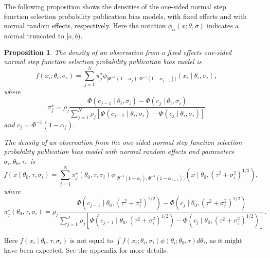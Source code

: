 \documentclass[useAMS,usenatbib,referee]{biom}
\newtheorem{prop}[theorem]{Proposition}
\renewcommand{\sqrt}[1]{(#1)^{1/2}}
\begin{document}
The following proposition shows the densities of the one-sided normal step function selection probability publication bias models, with fixed effects and with normal random effects, respectively. Here the notation $\phi_{\alpha}(x;\theta,\sigma)$ indicates a normal truncated to $[a,b)$.
\begin{prop}
\label{prop:One-sided normal discrete probability vector publication bias model-1}
The density of an observation from a fixed effects one-sided normal step function selection probability publication bias model is
\begin{equation}\label{eq:Fixed effects, publication bias}
f(x_{i};\theta_{i},\sigma_{i}) = \sum_{j=1}^{N}\pi_{j}^\star\phi_{[\Phi^{-1}(1-\alpha_{j}),\Phi^{-1}(1-\alpha_{j-1}))}(x_{i}\mid\theta_{i},\sigma_{i}),
\end{equation}
where
$$
\pi_{j}^{\star}=\rho_{j}\frac{\Phi(c_{j-1}\mid\theta_{i},\sigma_{i})-\Phi(c_{j}\mid\theta_{i},\sigma_{i})}{\sum_{j=1}^{N}\rho_{j}\left[\Phi(c_{j-1}\mid\theta_{i},\sigma_{i})-\Phi(c_{j}\mid\theta_{i},\sigma_{i})\right]}
$$
and $c_{j}=\Phi^{-1}(1-\alpha_{j})$.

The density of an observation from the one-sided normal step function selection probability publication bias model with normal random effects and parameters $\sigma_{i},\theta_{0},\tau,$ is
\begin{equation}\label{eq:Random effects, publication bias}
f(x\mid\theta_{0},\tau,\sigma_{i})=\sum_{j=1}^{N}\pi_{j}^{\star}(\theta_0,\tau,\sigma_{i})\phi_{[\Phi^{-1}(1-\alpha_{j}),\Phi^{-1}(1-\alpha_{j-1}))}(x\mid\theta_{0},\sqrt{\tau^{2}+\sigma_{i}^{2}}),
\end{equation}
where 
\[
\pi_{j}^{\star}(\theta_0,\tau,\sigma_{i})=\rho_{j}\frac{\Phi(c_{j-1}\mid\theta_{0},\sqrt{\tau^{2}+\sigma_{i}^{2}})-\Phi(c_{j}\mid\theta_{0},\sqrt{\tau^{2}+\sigma_{i}^{2}})}{\sum_{j=1}^{J}\rho_{j}\left[\Phi(c_{j-1}\mid\theta_{0},\sqrt{\tau^{2}+\sigma_{i}^{2}})-\Phi(c_{j}\mid\theta_{0},\sqrt{\tau^{2}+\sigma_{i}^{2}})\right]}.
\]
\end{prop}

Here $f(x_i\mid\theta_{0},\tau,\sigma_i)$ is not equal to $\int f(x_{i};\theta_{i},\sigma_{i})\phi(\theta_{i};\theta_{0},\tau)d\theta_{i}$,
as it might have been expected. See the appendix for more details.
\end{document}
